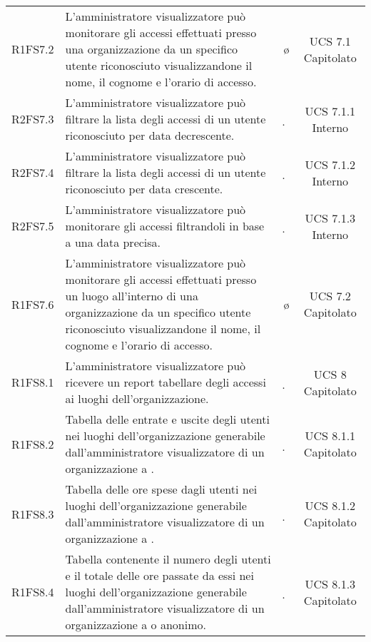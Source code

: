{\begin{longtable}{ c C{6.5cm} c c}
R1FS7.2 & L'amministratore visualizzatore può monitorare gli accessi effettuati presso una organizzazione da un specifico utente riconosciuto visualizzandone il nome, il cognome e l'orario di accesso. & \o & UCS 7.1 Capitolato\\

R2FS7.3 & L’amministratore visualizzatore può filtrare la lista degli accessi di un utente riconosciuto per data decrescente. & \d & UCS 7.1.1 Interno \\

R2FS7.4 & L’amministratore visualizzatore può filtrare la lista degli accessi di un utente riconosciuto per data crescente. & \d & UCS 7.1.2 Interno \\

R2FS7.5 & L'amministratore visualizzatore può monitorare gli accessi filtrandoli in base a una data precisa. & \d & UCS 7.1.3 Interno\\

R1FS7.6 & L'amministratore visualizzatore può monitorare gli accessi effettuati presso un luogo all'interno di una organizzazione da un specifico utente riconosciuto visualizzandone il nome, il cognome e l'orario di accesso. & \o & UCS 7.2 Capitolato\\

R1FS8.1 & L'amministratore visualizzatore può ricevere un report tabellare degli accessi ai luoghi dell'organizzazione. & \d & UCS 8 Capitolato\\

R1FS8.2 &  Tabella delle entrate e uscite degli utenti nei luoghi dell'organizzazione generabile dall'amministratore visualizzatore di un organizzazione a . & \d & UCS 8.1.1 Capitolato\\

R1FS8.3 & Tabella delle ore spese dagli utenti nei luoghi dell'organizzazione generabile dall'amministratore visualizzatore di un organizzazione a . & \d & UCS 8.1.2 Capitolato\\

R1FS8.4 & Tabella contenente il numero degli utenti e il totale delle ore passate da essi nei luoghi dell'organizzazione generabile dall'amministratore visualizzatore di un organizzazione a  o anonimo. & \d & UCS 8.1.3 Capitolato\\




\end{longtable}}

